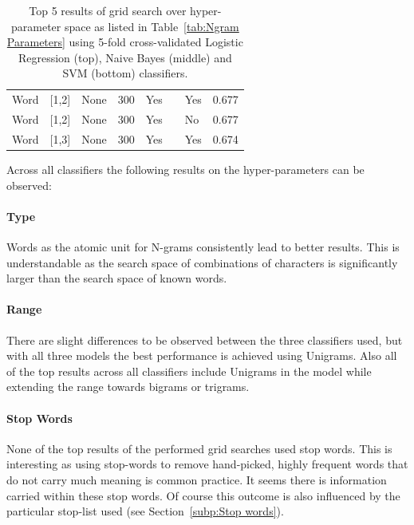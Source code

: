 \begin{table}[h]
\begin{center}
\begin{tabular}{ l l l l l l l l }
    Word & [1,2] & None & 300 & Yes & & Yes & 0.677 \\
    Word & [1,2] & None & 300 & Yes & & No  & 0.677 \\
    Word & [1,3] & None & 300 & Yes & & Yes & 0.674 \\
    \bottomrule
  \end{tabular}
  \caption{Top 5 results of grid search over hyper-parameter space as listed in Table~\ref{tab:Ngram Parameters} using 5-fold cross-validated Logistic Regression (top), Naive Bayes (middle) and SVM (bottom) classifiers.}
\label{tab:Ngram Grid Search}
\end{center}
\end{table}


Across all classifiers the following results on the hyper-parameters can be observed:

\paragraph{Type}
\label{par:Type}
Words as the atomic unit for N-grams consistently lead to better results. This is understandable as the search space of combinations of characters is significantly larger than the search space of known words.

\paragraph{Range}
\label{par:Range}
There are slight differences to be observed between the three classifiers used, but with all three models the best performance is achieved using Unigrams. Also all of the top results across all classifiers include Unigrams in the model while extending the range towards bigrams or trigrams.

\paragraph{Stop Words}
\label{par:Stop Words}
None of the top results of the performed grid searches used stop words. This is interesting as using stop-words to remove hand-picked, highly frequent words that do not carry much meaning is common practice. It seems there is information carried within these stop words. Of course this outcome is also influenced by the particular stop-list used (see Section~\ref{subp:Stop words}).

